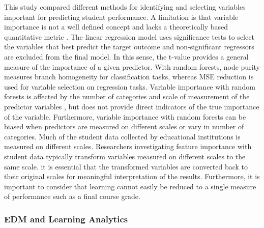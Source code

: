 \documentclass[sigconf]{acmart}
\begin{document}
This study compared different methods for identifying and selecting variables 
important for predicting student performance. A limitation is that variable 
importance is not a well defined concept and lacks a theoretically based 
quantitative metric \cite{gromping09}. The linear regression model uses 
significance tests to select the variables that best predict the target outcome 
and non-significant regressors are excluded from the final model. In this sense,
the t-value provides a general measure of the importance of a given predictor. 
With random forests, node purity measures branch homogeneity for classification 
tasks, whereas MSE reduction is used for variable selection on regression tasks. 
Variable importance with random forests is affected by the number of categories
and scale of measurement of the predictor variables \cite{strobl07}, but does 
not provide direct indicators of the true importance of the variable. 
Furthermore, variable importance with random forests can be biased when 
predictors are measured on different scales or vary in number of categories. 
Much of the student data collected by educational institutions is measured on 
different scales. Researchers investigating feature importance with student data 
typically transform variables measured on different scales to the same scale. 
it is essential that the transformed variables are converted back to their 
original scales for meaningful interpretation of the results. Furthermore, 
it is important to consider that learning cannot easily be reduced to a single 
measure of performance such as a final course grade.


\subsubsection{EDM and Learning Analytics}
\end{document}
